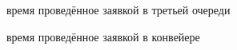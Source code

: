 \documentclass[12pt,a4paper]{report}
\begin{document}
\begin{figure}[h!]
    \caption{время проведённое заявкой в третьей очереди}
    \label{fig:image}
\end{figure}

\begin{figure}[h!]
    \caption{время проведённое заявкой в конвейере}
    \label{fig:image}
\end{figure}
\end{document}
